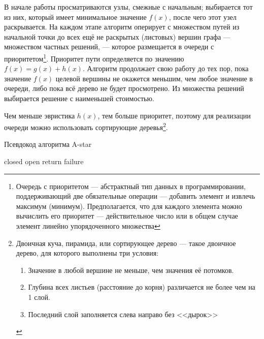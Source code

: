 \documentclass[12pt,chapterprefix=true,headings=onelineappendix]{scrartcl}
\begin{document}
В начале работы просматриваются узлы, смежные с начальным; выбирается тот из
них, который имеет минимальное значение $f(x)$, после чего этот узел
раскрывается. На каждом этапе алгоритм оперирует с множеством путей из
начальной точки до всех ещё не раскрытых (листовых) вершин графа — множеством
частных решений, — которое размещается в очереди с приоритетом\footnote{Очередь
	с приоритетом --- абстрактный тип данных в программировании, поддерживающий
	две обязательные операции — добавить элемент и извлечь
	максимум\cite{Sedgewick2011} (минимум). Предполагается, что для каждого
	элемента можно вычислить его приоритет — действительное число или в общем
	случае элемент линейно упорядоченного множества\cite{Ахо2001}}. Приоритет пути
определяется по значению $f(x) = g(x) + h(x)$. Алгоритм продолжает свою работу
до тех пор, пока значение $f(x)$ целевой вершины не окажется меньшим, чем любое
значение в очереди, либо пока всё дерево не будет просмотрено. Из множества
решений выбирается решение с наименьшей стоимостью.

Чем меньше эвристика $h(x)$, тем больше приоритет, поэтому для реализации
очереди можно ис\-поль\-зо\-вать сортирующие деревья\footnote{Двоичная куча,
	пирамида\cite{Кормен2005}, или сортирующее дерево --- такое двоичное дерево,
	для которого выполнены три условия:

	\begin{enumerate}
		\item Значение в любой вершине не меньше, чем значения её потомков.
		\item Глубина всех листьев (расстояние до корня) различается не более чем
		      на 1 слой.
		\item Последний слой заполняется слева направо без <<дырок>>
	\end{enumerate}
}.

\begin{algorithm}
	\caption{Псевдокод алгоритма A-star}
	\LinesNumbered{}


	\BlankLine

	closed \gets \set{} 
	open \gets {} 
	\;
	return failure\;
\end{algorithm}
\end{document}
